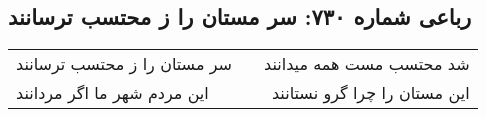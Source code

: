 \begin{center}
\section*{رباعی شماره ۷۳۰: سر مستان را ز محتسب ترسانند}
\label{sec:0730}
\begin{longtable}{l p{0.5cm} r}
سر مستان را ز محتسب ترسانند
&&
شد محتسب مست همه میدانند
\\
این مردم شهر ما اگر مردانند
&&
این مستان را چرا گرو نستانند
\\
\end{longtable}
\end{center}
